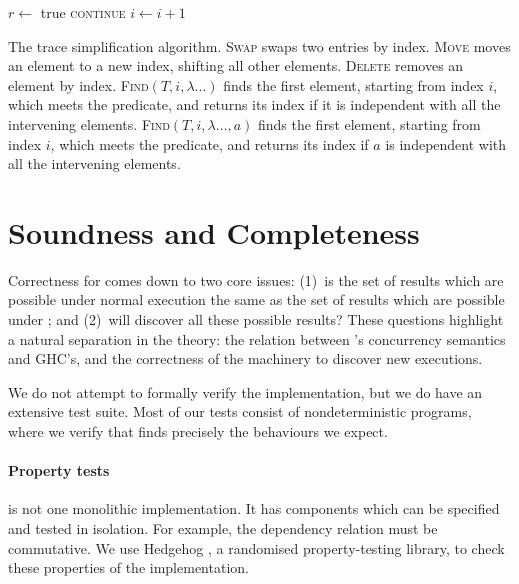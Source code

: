 \begin{listing}
\begin{minipage}{\linewidth}
\begin{algorithmic}
          \State {}
          \State $r \gets$ true
          \State \textsc{continue}
        \EndIf
      \EndIf
      \State $i \gets i + 1$
    \EndWhile
  \EndWhile
\EndFunction
\end{algorithmic}
\end{minipage}
  \caption[The trace simplification algorithm.]{The trace simplification algorithm.  \textsc{Swap} swaps two entries by index.  \textsc{Move} moves an element to a new index, shifting all other elements.  \textsc{Delete} removes an element by index.  \textsc{Find}$(T, i, \lambda\ldots)$ finds the first element, starting from index $i$, which meets the predicate, and returns its index if it is independent with all the intervening elements.  \textsc{Find}$(T, i, \lambda\ldots, a)$ finds the first element, starting from index $i$, which meets the predicate, and returns its index if $a$ is independent with all the intervening elements.}\label{lst:simpl_algo}
\end{listing}

\section{Soundness and Completeness}
\label{sec:dejafu-correctness}

Correctness for \dejafu{} comes down to two core issues: (1)~is the
set of results which are possible under normal execution the same as
the set of results which are possible under \dejafu{}; and (2)~will
\dejafu{} discover all these possible results?  These questions
highlight a natural separation in the theory: the relation between
\dejafu{}'s concurrency semantics and GHC's, and the correctness of
the machinery to discover new executions.

We do not attempt to formally verify the \dejafu{} implementation, but
we do have an extensive test suite.  Most of our tests consist of
nondeterministic programs, where we verify that \dejafu{} finds
precisely the behaviours we expect.

\paragraph{Property tests}
\dejafu{} is not one monolithic implementation.  It has components
which can be specified and tested in isolation.  For example, the
dependency relation must be commutative.  We use
Hedgehog \parencite{hedgehog}, a randomised property-testing library, to
check these properties of the implementation.

